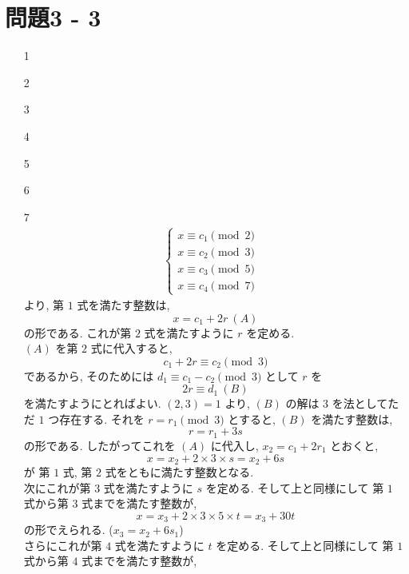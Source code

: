\documentclass[12pt,a4paper]{jsarticle}
\begin{document}
\section*{問題3 - 3}
\begin{enumerate}
 \item[1]  \mbox{} \\
 \item[2]  \mbox{} \\
 \item[3]  \mbox{} \\
 \item[4]  \mbox{} \\
 \item[5]  \mbox{} \\
 \item[6]  \mbox{} \\
 \item[7]  \mbox{} \\
 \begin{align*}
  \begin{cases}
  x \equiv c_1 \pmod{2} & \\
  x \equiv c_2 \pmod{3} & \\
  x \equiv c_3 \pmod{5} & \\
  x \equiv c_4 \pmod{7}
  \end{cases}
 \end{align*}
 より, 第 $1$ 式を満たす整数は,
 \[ x = c_1 + 2r~ (A) \]
 の形である. これが第 $2$ 式を満たすように $r$ を定める. \\
 $(A)$ を第 $2$ 式に代入すると,
 \[ c_1 + 2r \equiv c_2 \pmod{3} \] 
 であるから, そのためには $d_1 \equiv c_1 - c_2 \pmod{3}$ として $r$ を
 \[ 2r \equiv d_1~ (B) \]
 を満たすようにとればよい. $(2, 3) = 1$ より, $(B)$ の解は $3$ を法としてただ $1$ つ存在する. それを $r = r_1 \pmod{3}$ とすると, $(B)$ を満たす整数は,
 \[ r = r_1 + 3s \]
 の形である. したがってこれを $(A)$ に代入し, $x_2 = c_1 + 2r_1$ とおくと,
 \[ x = x_2 + 2 \times 3 \times s = x_2 + 6s \]
 が 第 $1$ 式, 第 $2$ 式をともに満たす整数となる. \\
 次にこれが第 $3$ 式を満たすように $s$ を定める. そして上と同様にして 第 $1$ 式から第 $3$ 式までを満たす整数が, 
 \[ x = x_3 + 2 \times 3 \times 5 \times t = x_3 + 30t \] 
 の形でえられる. ($x_3 = x_2 + 6s_1$)\\
 さらにこれが第 $4$ 式を満たすように $t$ を定める. そして上と同様にして 第 $1$ 式から第 $4$ 式までを満たす整数が, 

\end{enumerate}
\end{document}
